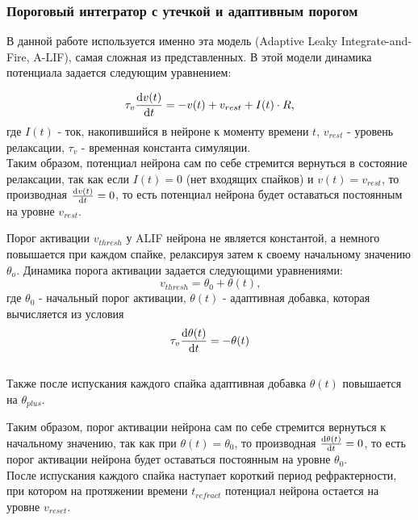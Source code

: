 \documentclass[a4paper]{article}
\begin{document}
\subsubsection{Пороговый интегратор с утечкой и адаптивным порогом}
В данной работе используется именно эта модель (Adaptive Leaky Integrate-and-Fire, A-LIF), самая сложная из представленных. В этой модели динамика потенциала задается следующим уравнением:

\begin{equation} \label{eq:alif}
 \tau_v \dv{v(t)}{t} = -v(t) + v_{rest} + I(t) \cdot R \text{,}
\end{equation} где $I(t)$ - ток, накопившийся в нейроне к моменту времени $t$, $v_{rest}$ - уровень релаксации, $\tau_v$ - временная константа симуляции.\\ 

Таким образом, потенциал нейрона сам по себе стремится вернуться в состояние релаксации, так как если $I(t) = 0$ (нет входящих спайков) и $v(t) = v_{rest}$, то производная $\dv{v(t)}{t} = 0$, то есть потенциал нейрона будет оставаться постоянным на уровне $v_{rest}$. 

Порог активации $v_{thresh}$ у ALIF нейрона не является константой, а немного повышается при каждом спайке, релаксируя затем к своему начальному значению $\theta_o$. Динамика порога активации задается следующими уравнениями:
\begin{equation} 
 v_{thresh} = \theta_0 + \theta(t) \text{,}
\end{equation} где $\theta_0$ - начальный порог активации, $\theta(t)$ - адаптивная добавка, которая вычисляется из условия\\

\begin{equation}
 \tau_v \dv{\theta(t)}{t} = -\theta(t)
\end{equation}\\

Также после испускания каждого спайка адаптивная добавка $\theta(t)$ повышается на $\theta_{plus}$.

Таким образом, порог активации нейрона сам по себе стремится вернуться к начальному значению, так как при $\theta(t) = \theta_0$, то производная $\dv{\theta(t)}{t} = 0$, то есть порог активации нейрона будет оставаться постоянным на уровне $\theta_0$.\\

После испускания каждого спайка наступает короткий период рефрактерности, при котором на протяжении времени $t_{refract}$ потенциал нейрона остается на уровне $v_{reset}$.
\end{document}
